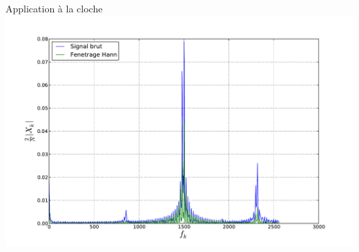 \documentclass[8pt,a4paper]{beamer}
\begin{document}
\begin{frame}{Application à la cloche}
\includegraphics[width=1.\textwidth]{figures/FFT_cloche.pdf} \\
\end{frame}
\end{document}
